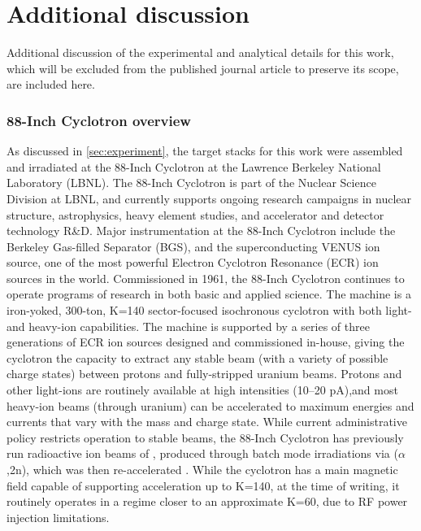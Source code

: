 % 
% 



% 
% 






\section{Additional discussion}


Additional discussion of the experimental and analytical details for this work, which will be excluded from the published journal article to preserve its scope, are included here.

\subsubsection{88-Inch Cyclotron overview}


As discussed in \autoref{sec:experiment}, the target stacks for this work were assembled and irradiated at the 88-Inch Cyclotron at the  Lawrence Berkeley National Laboratory (LBNL).
The 88-Inch Cyclotron is part of the  Nuclear Science Division at LBNL, and  currently supports   ongoing research campaigns in nuclear structure, astrophysics, heavy element studies, and accelerator and detector technology R\&D. 
Major instrumentation at the 88-Inch Cyclotron include the Berkeley Gas-filled Separator (BGS), and the superconducting VENUS ion source, one of the most powerful Electron Cyclotron Resonance (ECR) ion sources in the world.
Commissioned in 1961, the 88-Inch Cyclotron  continues to operate programs of research in both basic and applied science.
The machine is a iron-yoked, 300-ton, K=140 sector-focused isochronous cyclotron with both light- and heavy-ion capabilities. 
The machine is supported by a series of three generations of ECR ion sources designed and commissioned in-house, giving the cyclotron the capacity to extract any stable beam (with a variety of possible charge states) between protons and fully-stripped uranium beams.
Protons and other light-ions are routinely available at high intensities (10--20 p\mmicro A),and most heavy-ion beams (through uranium) can be accelerated to maximum energies and currents that vary with the mass and charge state.
While current administrative policy restricts operation to stable beams, the 88-Inch Cyclotron has previously run radioactive ion beams of , produced through batch mode irradiations via ($\alpha$,2n), which was then re-accelerated \cite{Cooper2004}.
While the cyclotron has a main magnetic field capable of supporting acceleration up to K=140, at the  time of  writing, it routinely operates in a regime closer to an approximate K=60, due to RF power injection limitations.


